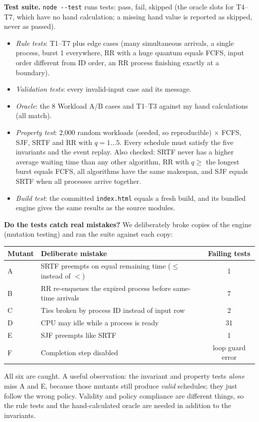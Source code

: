 \documentclass[11pt,a4paper]{article}
\begin{document}
\textbf{Test suite.} \texttt{node -{}-test} runs \stattests{} tests: \statpass{} pass, \statfail{} fail, \statskipped{}
skipped (the oracle slots for T4--T7, which have no hand calculation; a missing hand value is reported as skipped, never as
passed).
\begin{itemize}
  \item \emph{Rule tests}: T1--T7 plus edge cases (many simultaneous arrivals, a single process, burst 1 everywhere,
    RR with a huge quantum equals FCFS, input order different from ID order, an RR process finishing exactly at a boundary).
  \item \emph{Validation tests}: every invalid-input case and its message.
  \item \emph{Oracle}: the 8 Workload A/B cases and T1--T3 against my hand calculations (all match).
  \item \emph{Property test}: 2,000 random workloads (seeded, so reproducible) $\times$ FCFS, SJF, SRTF and RR with
    $q=1\ldots5$. Every schedule must satisfy the five invariants and the event replay. Also checked: SRTF never has a
    higher average waiting time than any other algorithm, RR with $q \ge$ the longest burst equals FCFS, all algorithms
    have the same makespan, and SJF equals SRTF when all processes arrive together.
  \item \emph{Build test}: the committed \texttt{index.html} equals a fresh build, and its bundled engine gives the same
    results as the source modules.
\end{itemize}

\textbf{Do the tests catch real mistakes?} We deliberately broke copies of the engine (mutation testing) and ran the
suite against each copy:
\begin{center}\small
\begin{tabular}{lp{8.4cm}c}
\toprule
Mutant & Deliberate mistake & Failing tests \\
\midrule
A & SRTF preempts on equal remaining time ($\le$ instead of $<$) & 1 \\
B & RR re-enqueues the expired process before same-time arrivals & 7 \\
C & Ties broken by process ID instead of input row & 2 \\
D & CPU may idle while a process is ready & 31 \\
E & SJF preempts like SRTF & 1 \\
F & Completion step disabled & loop guard error \\
\bottomrule
\end{tabular}
\end{center}
All six are caught. A useful observation: the invariant and property tests \emph{alone} miss A and E, because those
mutants still produce \emph{valid} schedules; they just follow the wrong policy. Validity and policy compliance are
different things, so the rule tests and the hand-calculated oracle are needed in addition to the invariants.
\end{document}
